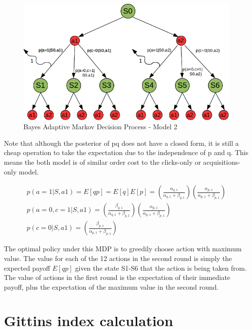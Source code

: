 \documentclass[11pt,a4,singlespacing,titlepagenumber=on]{scrreprt}
\numberwithin{equation}{chapter} %
\theoremstyle{remark}
\begin{document}
\begin{figure}[p]
    \centering
    \includegraphics[scale=0.6]{BAMDP.jpg}
    \caption{ Bayes Adaptive Markov Decision Process - Model 2 }
\end{figure}


Note that although the posterior of pq does not have a closed form, it is still a cheap operation to take the expectation due to the independence of p and q. This means the both model is of similar order cost to the clicks-only or acquisitions-only model.

\begin{align}
	p(a=1|S,a1) = E[qp] = E[q]E[p] = 
		\left( \frac{ \alpha_{q,1} }{ \alpha_{q,1} + \beta_{q,1} } \right)
		\left( \frac{ \alpha_{p,1} }{ \alpha_{p,1} + \beta_{p,1} } \right) \\
	p(a=0,c=1|S,a1) = 
		\left( \frac{ \beta_{q,1} }{ \alpha_{q,1} + \beta_{q,1} } \right)
		\left( \frac{ \alpha_{p,1} }{ \alpha_{p,1} + \beta_{p,1} } \right) \\
	p(c=0|S,a1) = 
		\left( \frac{ \beta_{p,1} }{ \alpha_{p,1} + \beta_{p,1} } \right) 
\end{align}	

The optimal policy under this MDP is to greedily choose action with maximum value. The value for each of the 12 actions in the second round is simply the expected payoff $E[qp]$ given the state S1-S6 that the action is being taken from. The value of actions in the first round is the expectation of their immediate payoff, plus the expectation of the maximum value in the second round.

\section{Gittins index calculation}
\end{document}
